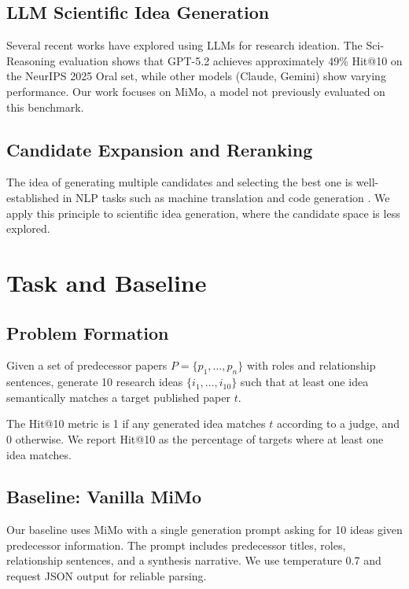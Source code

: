 \documentclass[conference]{IEEEtran}
\begin{document}
\subsection{LLM Scientific Idea Generation}

Several recent works have explored using LLMs for research ideation. The Sci-Reasoning evaluation shows that GPT-5.2 achieves approximately 49\% Hit@10 on the NeurIPS 2025 Oral set, while other models (Claude, Gemini) show varying performance. Our work focuses on MiMo, a model not previously evaluated on this benchmark.

\subsection{Candidate Expansion and Reranking}

The idea of generating multiple candidates and selecting the best one is well-established in NLP tasks such as machine translation \cite{beamsearch} and code generation \cite{codex}. We apply this principle to scientific idea generation, where the candidate space is less explored.

\section{Task and Baseline}

\subsection{Problem Formation}

Given a set of predecessor papers $P = \{p_1, \ldots, p_n\}$ with roles and relationship sentences, generate 10 research ideas $\{i_1, \ldots, i_{10}\}$ such that at least one idea semantically matches a target published paper $t$.

The Hit@10 metric is 1 if any generated idea matches $t$ according to a judge, and 0 otherwise. We report Hit@10 as the percentage of targets where at least one idea matches.

\subsection{Baseline: Vanilla MiMo}

Our baseline uses MiMo with a single generation prompt asking for 10 ideas given predecessor information. The prompt includes predecessor titles, roles, relationship sentences, and a synthesis narrative. We use temperature 0.7 and request JSON output for reliable parsing.
\end{document}
